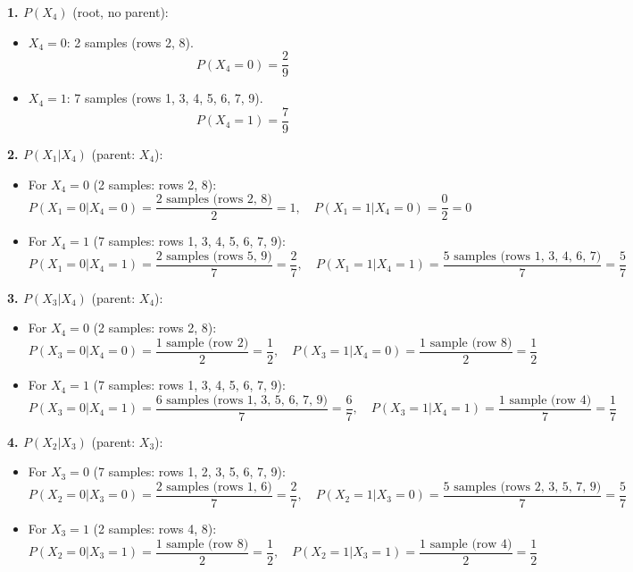 \documentclass[a3paper,12pt]{extarticle} %
\begin{document}
\begin{enumerate}
\textbf{1. \(P(X_4)\)} (root, no parent):
\begin{itemize}
    \item \(X_4 = 0\): 2 samples (rows 2, 8).
    \[
    P(X_4 = 0) = \frac{2}{9}
    \]
    \item \(X_4 = 1\): 7 samples (rows 1, 3, 4, 5, 6, 7, 9).
    \[
    P(X_4 = 1) = \frac{7}{9}
    \]
\end{itemize}

\textbf{2. \(P(X_1 | X_4)\)} (parent: \(X_4\)):
\begin{itemize}
    \item For \(X_4 = 0\) (2 samples: rows 2, 8):
    \[
    P(X_1 = 0 | X_4 = 0) = \frac{\text{2 samples (rows 2, 8)}}{2} = 1, \quad P(X_1 = 1 | X_4 = 0) = \frac{0}{2} = 0
    \]
    \item For \(X_4 = 1\) (7 samples: rows 1, 3, 4, 5, 6, 7, 9):
    \[
    P(X_1 = 0 | X_4 = 1) = \frac{\text{2 samples (rows 5, 9)}}{7} = \frac{2}{7}, \quad P(X_1 = 1 | X_4 = 1) = \frac{\text{5 samples (rows 1, 3, 4, 6, 7)}}{7} = \frac{5}{7}
    \]
\end{itemize}

\textbf{3. \(P(X_3 | X_4)\)} (parent: \(X_4\)):
\begin{itemize}
    \item For \(X_4 = 0\) (2 samples: rows 2, 8):
    \[
    P(X_3 = 0 | X_4 = 0) = \frac{\text{1 sample (row 2)}}{2} = \frac{1}{2}, \quad P(X_3 = 1 | X_4 = 0) = \frac{\text{1 sample (row 8)}}{2} = \frac{1}{2}
    \]
    \item For \(X_4 = 1\) (7 samples: rows 1, 3, 4, 5, 6, 7, 9):
    \[
    P(X_3 = 0 | X_4 = 1) = \frac{\text{6 samples (rows 1, 3, 5, 6, 7, 9)}}{7} = \frac{6}{7}, \quad P(X_3 = 1 | X_4 = 1) = \frac{\text{1 sample (row 4)}}{7} = \frac{1}{7}
    \]
\end{itemize}

\textbf{4. \(P(X_2 | X_3)\)} (parent: \(X_3\)):
\begin{itemize}
    \item For \(X_3 = 0\) (7 samples: rows 1, 2, 3, 5, 6, 7, 9):
    \[
    P(X_2 = 0 | X_3 = 0) = \frac{\text{2 samples (rows 1, 6)}}{7} = \frac{2}{7}, \quad P(X_2 = 1 | X_3 = 0) = \frac{\text{5 samples (rows 2, 3, 5, 7, 9)}}{7} = \frac{5}{7}
    \]
    \item For \(X_3 = 1\) (2 samples: rows 4, 8):
    \[
    P(X_2 = 0 | X_3 = 1) = \frac{\text{1 sample (row 8)}}{2} = \frac{1}{2}, \quad P(X_2 = 1 | X_3 = 1) = \frac{\text{1 sample (row 4)}}{2} = \frac{1}{2}
    \]
\end{itemize}


\end{enumerate}
\end{document}
